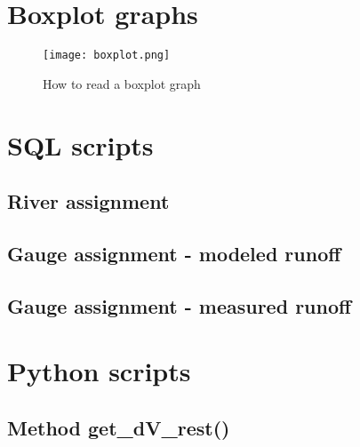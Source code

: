 \appendix
\chapter{Boxplot graphs}
\label{app:boxplot}

\begin{figure}[H]
\centering
\texttt{[image: boxplot.png]}
\caption[How to read a boxplot graph]{How to read a boxplot graph \cite{stk_boxplot}}
\label{boxlot}
\end{figure}

\chapter{SQL scripts}
\section{River assignment}
\label{app:sql_assign_river}




\section{Gauge assignment - modeled runoff}
\label{app:sql_assign_watergap}




\section{Gauge assignment - measured runoff}
\label{app:sql_assign_gauge}



\chapter{Python scripts}
\section{Method get{\_}dV{\_}rest()}
\label{app:get_dV_rest}



